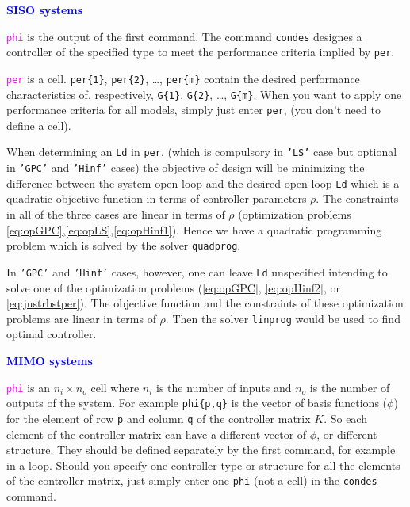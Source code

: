 \documentclass [12pt , a4paper] {article}
\begin{document}
\textcolor{blue}{\textbf{SISO systems}}

\textcolor{magenta}{\texttt{phi}} is the output of the first command. The command \texttt{condes} designes a controller of the specified type to meet the performance criteria implied by \texttt{per}.

\textcolor{magenta}{\texttt{per}} is a cell. \texttt{per\{1\}}, \texttt{per\{2\}}, \dots, \texttt{per\{m\}} contain the desired performance characteristics of, respectively, \texttt{G\{1\}}, \texttt{G\{2\}}, \dots, \texttt{G\{m\}}. When you want to apply one performance criteria for all models, simply just enter \texttt{per}, (you don't need to define a cell).

When determining an \texttt{Ld} in \texttt{per}, (which is compulsory in \texttt{'LS'} case but optional in \texttt{'GPC'} and \texttt{'Hinf'} cases) the objective of design will be minimizing the difference between the system open loop and the desired open loop \texttt{Ld} which is a quadratic objective function in terms of controller parameters $\rho$. The constraints in all of the three cases are linear in terms of $\rho$ (optimization problems \ref{eq:opGPC},\ref{eq:opLS},\ref{eq:opHinf1}). Hence we have a quadratic programming problem which is solved by the solver \texttt{quadprog}.

In \texttt{'GPC'} and \texttt{'Hinf'} cases, however, one can leave \texttt{Ld} unspecified intending to solve one of the optimization problems (\ref{eq:opGPC}, \ref{eq:opHinf2}, or \ref{eq:justrbstper}). The objective function and the constraints of these optimization problems are linear in terms of $\rho$. Then the solver \texttt{linprog} would be used to find optimal controller.

\textcolor{blue}{\textbf{MIMO systems}}

\textcolor{magenta}{\texttt{phi}} is an $n_i \times n_o$ cell where $n_i$ is the number of inputs and $n_o$ is the number of outputs of the system. For example \texttt{phi\{p,q\}} is the vector of basis functions ($\phi$) for the element of row \texttt{p} and column \texttt{q} of the controller matrix $K$. So each element of the controller matrix can have a different vector of $\phi$, or different structure. They should be defined separately by the first command, for example in a loop. Should you specify one controller type or structure for all the elements of the controller matrix, just simply enter one \texttt{phi} (not a cell) in the \texttt{condes} command. 
\end{document}
